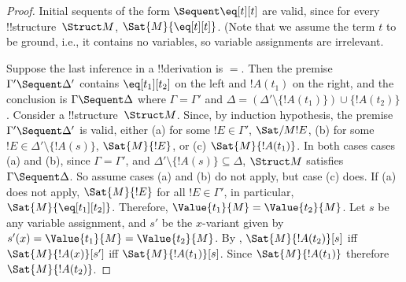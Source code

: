\documentclass[../../include/open-logic-section]{subfiles}
\begin{document}
\begin{proof}
Initial sequents of the form ${} \Sequent \eq[t][t]$ are valid, since
for every !!{structure}~$\Struct M$, $\Sat{M}{\eq[t][t]}$. (Note that
we assume the term $t$ to be ground, i.e., it contains no variables,
so variable assignments are irrelevant.

Suppose the last inference in a !!{derivation} is $=$. Then the
premise $\Gamma' \Sequent \Delta'$ contains $\eq[t_1][t_2]$ on the left
and $!A(t_1)$ on the right, and the conclusion is $\Gamma \Sequent
\Delta$ where $\Gamma = \Gamma'$ and $\Delta = (\Delta' \setminus
\{!A(t_1)\}) \cup \{!A(t_2)\}$. Consider a !!{structure}~$\Struct
M$. Since, by induction hypothesis, the premise $\Gamma' \Sequent
\Delta'$ is valid, either (a) for some $!E \in \Gamma'$,
$\Sat/{M}{!E}$, (b) for some $!E \in \Delta' \setminus \{!A(s)\}$,
$\Sat{M}{!E}$, or (c) $\Sat{M}{!A(t_1)}$.  In both cases cases (a) and
(b), since $\Gamma = \Gamma'$, and $\Delta' \setminus \{!A(s)\}
\subseteq \Delta$, $\Struct M$ satisfies $\Gamma \Sequent \Delta$. So
assume cases (a) and (b) do not apply, but case (c) does.  If (a) does
not apply, $\Sat{M}{!E}$ for all $!E \in \Gamma'$, in particular,
$\Sat{M}{\eq[t_1][t_2]}$.  Therefore, $\Value{t_1}{M} = \Value{t_2}{M}$.  Let
$s$ be any variable assignment, and $s'$ be the $x$-variant given by
$s'(x) = \Value{t_1}{M} = \Value{t_2}{M}$. By
, $\Sat{M}{!A(t_2)}[s]$ iff
$\Sat{M}{!A(x)}[s']$ iff $\Sat{M}{!A(t_1)}[s]$. Since $\Sat{M}{!A(t_1)}$
therefore $\Sat{M}{!A(t_2)}$.
\end{proof}
\end{document}
